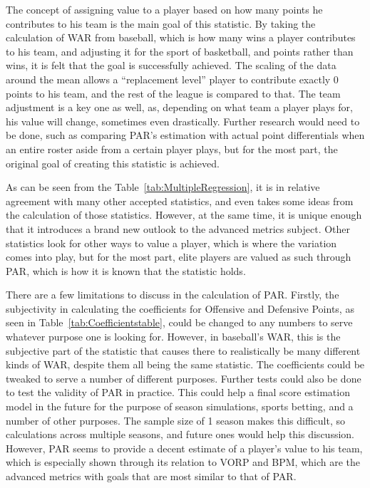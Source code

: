 \documentclass[12pt]{article}
\begin{document}
The concept of assigning value to a player based on how many points he 
contributes to his team is the main goal of this statistic. By taking the 
calculation of WAR from baseball, which is how many wins a player 
contributes to his team, and adjusting it for the sport of basketball, and 
points rather than wins, it is felt that the goal is successfully achieved. The 
scaling of the data around the mean allows a ``replacement level'' player 
to contribute exactly 0 points to his team, and the rest of the league is 
compared to that. The team adjustment is a key one as well, as, 
depending on what team a player plays for, his value will change, 
sometimes even drastically. Further research would need to be done, 
such as comparing PAR's estimation with actual point differentials when 
an entire roster aside from a certain player plays, but for the most part, 
the original goal of creating this statistic is achieved.

As can be seen from the 
Table~\ref{tab:MultipleRegression}, it is in relative agreement with many 
other accepted statistics, and even takes some ideas from the calculation 
of those statistics. However, at the same time, it is unique enough that it 
introduces a brand new outlook to the advanced metrics subject. Other 
statistics look for other ways to value a player, which is where the 
variation comes into play, but for the most part, elite players are valued as 
such through PAR, which is how it is known that the statistic holds.

There are a few limitations to discuss in the calculation of PAR. Firstly, the 
subjectivity in calculating the coefficients for Offensive and Defensive 
Points, as seen in Table~\ref{tab:Coefficientstable}, could be changed to 
any numbers to serve whatever purpose one is looking for. However, in 
baseball's WAR, this is the subjective part of the statistic that causes 
there to realistically be many different kinds of WAR, despite them all 
being the same statistic. The coefficients could be tweaked to serve a 
number of different purposes. Further tests could also be done to test the 
validity of PAR in practice. This could help a final score estimation model 
in the future for the purpose of season simulations, sports betting, and a 
number of other purposes. The sample size of 1 season makes this 
difficult, so calculations across multiple seasons, and future ones would 
help this discussion. However, PAR seems to provide a decent estimate of 
a player's value to his team, which is especially shown through its relation 
to VORP and BPM, which are the advanced metrics with goals that are 
most similar to that of PAR.
\end{document}
